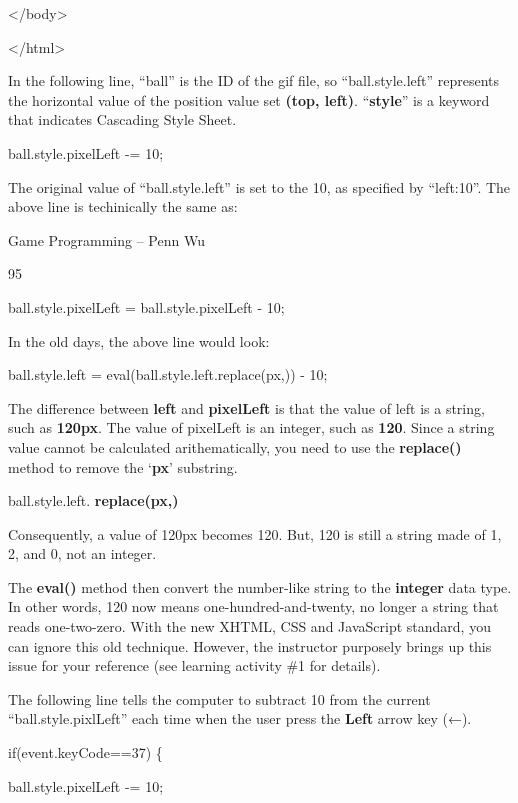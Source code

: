 \documentclass[
]{article}
\begin{document}
\textless/body\textgreater{}

\textless/html\textgreater{}

In the following line, ``ball'' is the ID of the gif file, so
``ball.style.left'' represents the horizontal value of the position
value set \textbf{(top, left)}. ``\textbf{style}'' is a keyword that
indicates Cascading Style Sheet.

ball.style.pixelLeft -= 10;

The original value of ``ball.style.left'' is set to the 10, as specified
by ``left:10''. The above line is techinically the same as:

Game Programming -- Penn Wu

95

\protect\hypertarget{index_split_007.htmlux5cux23p96}{}{}

ball.style.pixelLeft = ball.style.pixelLeft - 10;

In the old days, the above line would look:

ball.style.left =
eval(ball.style.left.replace(\textquotesingle px\textquotesingle,\textquotesingle\textquotesingle))
- 10;

The difference between \textbf{left} and \textbf{pixelLeft} is that the
value of left is a string, such as \textbf{120px}. The value of
pixelLeft is an integer, such as \textbf{120}. Since a string value
cannot be calculated arithematically, you need to use the
\textbf{replace()} method to remove the `\textbf{px}' substring.

ball.style.left.
\textbf{replace(\textquotesingle px\textquotesingle,\textquotesingle\textquotesingle)}

Consequently, a value of 120px becomes 120. But, 120 is still a string
made of 1, 2, and 0, not an integer.

The \textbf{eval()} method then convert the number-like string to the
\textbf{integer} data type. In other words, 120 now means
one-hundred-and-twenty, no longer a string that reads one-two-zero. With
the new XHTML, CSS and JavaScript standard, you can ignore this old
technique. However, the instructor purposely brings up this issue for
your reference (see learning activity \#1 for details).

The following line tells the computer to subtract 10 from the current
``ball.style.pixlLeft'' each time when the user press the \textbf{Left}
arrow key (←).

if(event.keyCode==37) \{

ball.style.pixelLeft -= 10;
\end{document}

